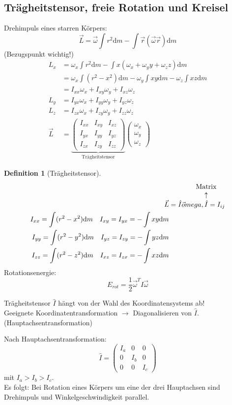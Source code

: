 \documentclass[a4paper]{scrartcl}
\renewcommand{\d}{\mathrm{d}}
\renewcommand{\v}[1]{\vec{#1}}
\theoremstyle{definition}
\newtheorem{defn}{Definition}
\theoremstyle{plain}
\theoremstyle{plain}
\theoremstyle{remark}
\theoremstyle{remark}
\theoremstyle{remark}
\begin{document}
\subsection{Trägheitstensor, freie Rotation und Kreisel}
\label{sec-8-8}
Drehimpuls eines starren Körpers:
\[\v L = \v \omega \int r^2 \d m - \int \v r (\v \omega \v r) \d m\]
(Bezugspunkt wichtig!)
\begin{align*}
L_x &= \omega_x \int r^2 \d m - \int x (\omega_x + \omega_y y + \omega_z z) \d m \\
&= \omega_x \int (r^2 - x^2) \d m - \omega_y \int xy \d m - \omega_z \int xz \d m \\
&= I_{xx} \omega_x + I_{xy} \omega_y + I_{xz} \omega_z \\
L_y &= I_{yx} \omega_x + I_{yy} \omega_y + I_{yz} \omega_z \\
L_z &= I_{zx} \omega_x + I_{zy} \omega_y + I_{zz} \omega_z \\
\v L &= \underbrace{\begin{pmatrix}
I_{xx} & I_{xy} & I_{xz} \\
I_{yx} & I_{yy} & I_{yz} \\
I_{zx} & I_{zy} & I_{zz}
\end{pmatrix}}_{\text{Trägheitstensor}}
\begin{pmatrix}
\omega_x \\
\omega_y \\
\omega_z
\end{pmatrix}
\end{align*}
\begin{defn}[Trägheitstensor]
\begin{align*}
\v L &= \hat I \v omega, \overarrow[\hat I]{Matrix} = I_{ij} \\
I_{xx} = \int (r^2 - x^2) \d m \quad I_{xy} = I_{yx} = -\int xy \d m \\
I_{yy} = \int (r^2 - y^2) \d m \quad I_{yz} = I_{zy} = -\int yz \d m \\
I_{zz} = \int (r^2 - z^2) \d m \quad I_{xz} = I_{zx} = -\int xz \d m
\end{align*}
Rotationsenergie:
\[E_{rot} = \frac{1}{2} \v \omega^{T} \hat I \v \omega\]
\end{defn}
Trägheitstensor $\hat I$ hängt von der Wahl des Koordinatensystems ab! \\
   Geeignete Koordinatentransformation $\rightarrow$ Diagonalisieren von $\hat I$. (Hauptachsentransformation)

Nach Hauptachsentransformation:
\[\hat I = \begin{pmatrix} I_a & 0 & 0 \\ 0 & I_b & 0 \\ 0 & 0 & I_c \end{pmatrix}\]
mit $I_a > I_b > I_c$. \\
   Es folgt: Bei Rotation eines Körpers um eine der drei Hauptachsen sind Drehimpuls und Winkelgeschwindigkeit parallel.
\end{document}
